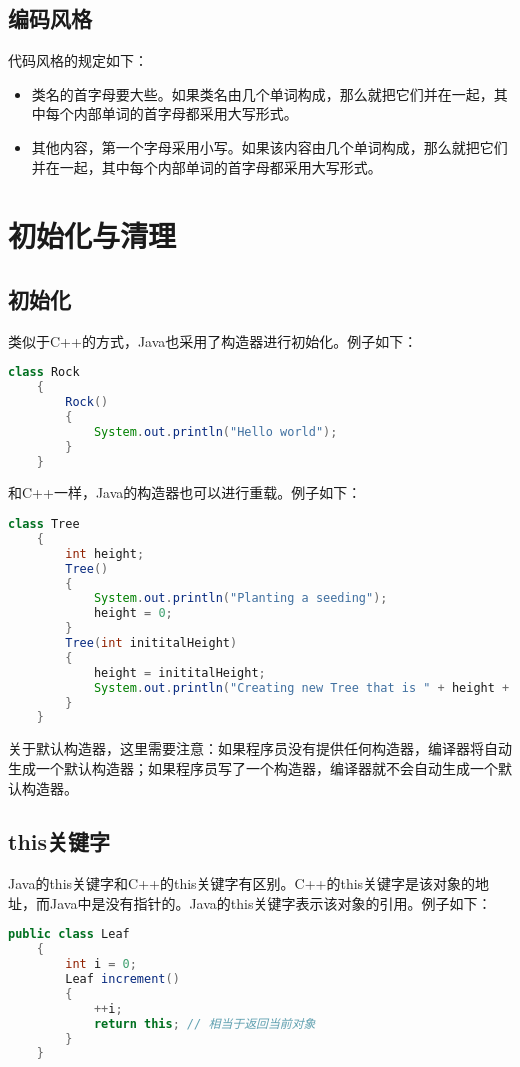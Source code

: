 \documentclass[a4paper,left=2.5cm,right=2.5cm,11pt]{article}
\begin{document}
\subsection{编码风格}
	代码风格的规定如下：
	\begin{itemize}
		\item 类名的首字母要大些。如果类名由几个单词构成，那么就把它们并在一起，其中每个内部单词的首字母都采用大写形式。
		\item 其他内容，第一个字母采用小写。如果该内容由几个单词构成，那么就把它们并在一起，其中每个内部单词的首字母都采用大写形式。
	\end{itemize}

\clearpage

\section{初始化与清理}
\subsection{初始化}
	类似于C++的方式，Java也采用了构造器进行初始化。例子如下：
	\begin{lstlisting}[language = Java]
	class Rock
	{
		Rock()
		{
			System.out.println("Hello world");
		}
	}
	\end{lstlisting}

	和C++一样，Java的构造器也可以进行重载。例子如下：
	\begin{lstlisting}[language = Java]
	class Tree
	{
		int height;
		Tree()
		{
			System.out.println("Planting a seeding");
			height = 0;
		}
		Tree(int inititalHeight)
		{
			height = inititalHeight;
			System.out.println("Creating new Tree that is " + height + " feer tall");
		}
	}
	\end{lstlisting}

	关于默认构造器，这里需要注意：如果程序员没有提供任何构造器，编译器将自动生成一个默认构造器；如果程序员写了一个构造器，编译器就不会自动生成一个默认构造器。

\subsection{this关键字}
	Java的this关键字和C++的this关键字有区别。C++的this关键字是该对象的地址，而Java中是没有指针的。Java的this关键字表示该对象的引用。例子如下：
	\begin{lstlisting}[language = Java]
	public class Leaf
	{
		int i = 0;
		Leaf increment()
		{
			++i;
			return this; // 相当于返回当前对象
		}
	}
	\end{lstlisting}
\end{document}
